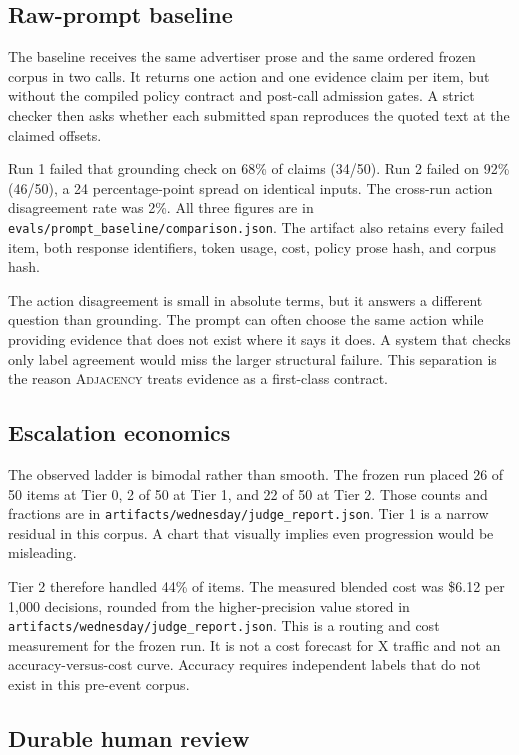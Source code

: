 \documentclass{article}
\newcommand{\artifact}[1]{\nolinkurl{#1}}
\newcommand{\Adj}{\textsc{Adjacency}\xspace}
\begin{document}
\subsection{Raw-prompt baseline}

The baseline receives the same advertiser prose and the same ordered frozen corpus in two calls.
It returns one action and one evidence claim per item, but without the compiled policy contract and
post-call admission gates. A strict checker then asks whether each submitted span reproduces the
quoted text at the claimed offsets.

Run 1 failed that grounding check on 68\% of claims (34/50). Run 2 failed on 92\% (46/50), a
24 percentage-point spread on identical inputs. The cross-run action disagreement rate was 2\%.
All three figures are in \artifact{evals/prompt_baseline/comparison.json}. The artifact also retains
every failed item, both response identifiers, token usage, cost, policy prose hash, and corpus hash.

The action disagreement is small in absolute terms, but it answers a different question than
grounding. The prompt can often choose the same action while providing evidence that does not exist
where it says it does. A system that checks only label agreement would miss the larger structural
failure. This separation is the reason \Adj treats evidence as a first-class contract.

\subsection{Escalation economics}

The observed ladder is bimodal rather than smooth. The frozen run placed 26 of 50 items at Tier 0,
2 of 50 at Tier 1, and 22 of 50 at Tier 2. Those counts and fractions are in
\artifact{artifacts/wednesday/judge_report.json}. Tier 1 is a narrow residual in this corpus. A chart
that visually implies even progression would be misleading.

Tier 2 therefore handled 44\% of items. The measured blended cost was \$6.12 per 1,000 decisions,
rounded from the higher-precision value stored in
\artifact{artifacts/wednesday/judge_report.json}. This is a routing and cost measurement for the
frozen run. It is not a cost forecast for X traffic and not an accuracy-versus-cost curve. Accuracy
requires independent labels that do not exist in this pre-event corpus.

\subsection{Durable human review}
\end{document}
